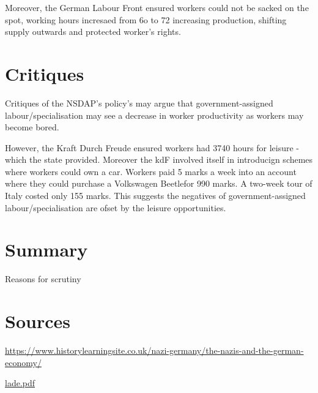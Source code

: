 \documentclass{article}
\begin{document}
Moreover, the German Labour Front ensured workers could not be sacked on the spot,
working hours incresaed from 6o to 72 increasing production, shifting supply outwards and
protected worker's rights.


\section*{Critiques}
Critiques of the NSDAP's policy's may argue that government-assigned labour/specialisation may see
a decrease in worker productivity as workers may become bored.

However, the Kraft Durch Freude ensured workers
had 3740 hours for leisure - which the state provided. Moreover the kdF involved itself in introducign schemes where
workers could own a car. Workers paid 5 marks a week into an account where they could purchase a Volkswagen Beetlefor 990
marks. A two-week tour of Italy costed only 155 marks. This suggests the negatives of
government-assigned labour/specialisation are ofset by the leisure opportunities.


\newpage

\section*{Summary}
Reasons for scrutiny

\section*{Sources}
\url{https://www.historylearningsite.co.uk/nazi-germany/the-nazis-and-the-german-economy/}

\url{lade.pdf}
\end{document}
